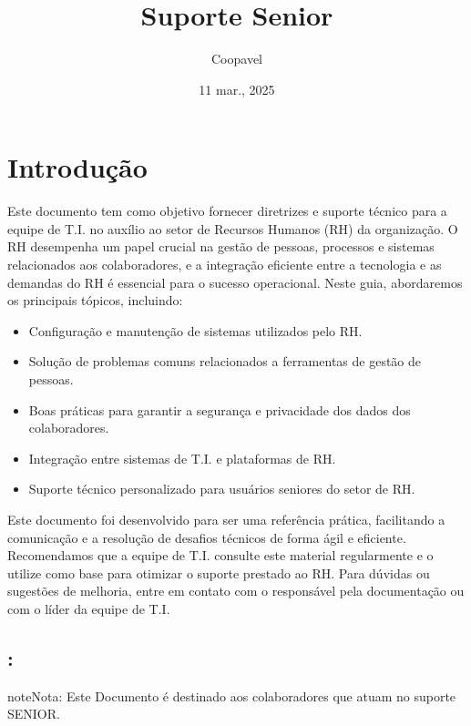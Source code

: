 \documentclass[a4paper,10pt,portuges]{sphinxmanual}
\title{Suporte Senior}
\date{11 mar., 2025}
\author{Coopavel}
\let\sphinxpxdimen\pdfpxdimen\else\newdimen\sphinxpxdimen
\begin{document}
\pagestyle{empty}
\sphinxmaketitle
\pagestyle{plain}
\sphinxtableofcontents
\pagestyle{normal}
\label{\detokenize{index::doc}}

\label{\detokenize{index:introducao}}
\noindent\sphinxincludegraphics[width=200\sphinxpxdimen]{{coopavel}.png}


\chapter{Introdução}
\label{\detokenize{index:id1}}
\sphinxAtStartPar
Este documento tem como objetivo fornecer diretrizes e suporte técnico para a equipe de T.I. no auxílio ao setor de Recursos Humanos (RH) da organização. O RH desempenha um papel crucial na gestão de pessoas, processos e sistemas relacionados aos colaboradores, e a integração eficiente entre a tecnologia e as demandas do RH é essencial para o sucesso operacional.
Neste guia, abordaremos os principais tópicos, incluindo:
\begin{itemize}
\item {} 
\sphinxAtStartPar
Configuração e manutenção de sistemas utilizados pelo RH.

\item {} 
\sphinxAtStartPar
Solução de problemas comuns relacionados a ferramentas de gestão de pessoas.

\item {} 
\sphinxAtStartPar
Boas práticas para garantir a segurança e privacidade dos dados dos colaboradores.

\item {} 
\sphinxAtStartPar
Integração entre sistemas de T.I. e plataformas de RH.

\item {} 
\sphinxAtStartPar
Suporte técnico personalizado para usuários seniores do setor de RH.

\end{itemize}

\sphinxAtStartPar
Este documento foi desenvolvido para ser uma referência prática, facilitando a comunicação e a resolução de desafios técnicos de forma ágil e eficiente. Recomendamos que a equipe de T.I. consulte este material regularmente e o utilize como base para otimizar o suporte prestado ao RH.
Para dúvidas ou sugestões de melhoria, entre em contato com o responsável pela documentação ou com o líder da equipe de T.I.


\section{:}
\label{\detokenize{index:publico-alvo}}
\begin{sphinxadmonition}{note}{Nota:}
\sphinxAtStartPar
Este Documento é destinado aos colaboradores que atuam no suporte
SENIOR.
\end{sphinxadmonition}
\end{document}
